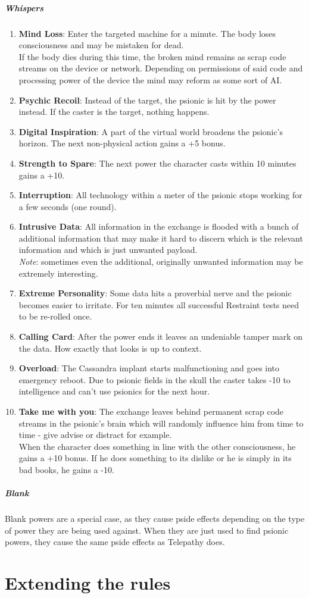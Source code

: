 \documentclass[12pt,a4paper,openany]{book}
\newcommand{\mod}[2]{\item \textbf{#1}: #2}
\newcommand{\dpeii}{\mod{Psychic Recoil}{Instead of the target, the psionic is hit by the power instead. If the caster is the target, nothing happens.}}
\newcommand{\dpeiv}{\mod{Strength to Spare}{The next power the character casts within 10 minutes gains a +10.}}
\newcommand{\dpeix}{\mod{Overload}{The Cassandra implant starts malfunctioning and goes into emergency reboot. Due to psionic fields in the skull the caster takes -10 to intelligence and can't use psionics for the next hour.}\setcounter{enumi}{-1}}
\begin{document}
	\paragraph{Whispers}
	\begin{enumerate}
		\mod{Mind Loss}{Enter the targeted machine for a minute. The body loses consciousness and may be mistaken for dead.\\
			If the body dies during this time, the broken mind remains as scrap code streams on the device or network. Depending on permissions of said code and processing power of the device the mind may reform as some sort of AI.}
		\dpeii
		\mod{Digital Inspiration}{A part of the virtual world broadens the psionic's horizon. The next non-physical action gains a +5 bonus.}
		\dpeiv
		\mod{Interruption}{All technology within a meter of the psionic stops working for a few seconds (one round).}
		\mod{Intrusive Data}{All information in the exchange is flooded with a bunch of additional information that may make it hard to discern which is the relevant information and which is just unwanted payload.\\
			\emph{Note}: sometimes even the additional, originally unwanted information may be extremely interesting.}
		\mod{Extreme Personality}{Some data hits a proverbial nerve and the psionic becomes easier to irritate. For ten minutes all successful Restraint tests need to be re-rolled once.}
		\mod{Calling Card}{After the power ends it leaves an undeniable tamper mark on the data. How exactly that looks is up to context.}
		\dpeix
		\mod{Take me with you}{The exchange leaves behind permanent scrap code streams in the psionic's brain which will randomly influence him from time to time - give advise or distract for example.\\
			When the character does something in line with the other consciousness, he gains a +10 bonus. If he does something to its dislike or he is simply in its bad books, he gains a -10.}
	\end{enumerate}
	\paragraph{Blank\\}
	Blank powers are a special case, as they cause pside effects depending on the type of power they are being used against. When they are just used to find psionic powers, they cause the same pside effects as Telepathy does.
	
	\chapter{Extending the rules}
\end{document}
